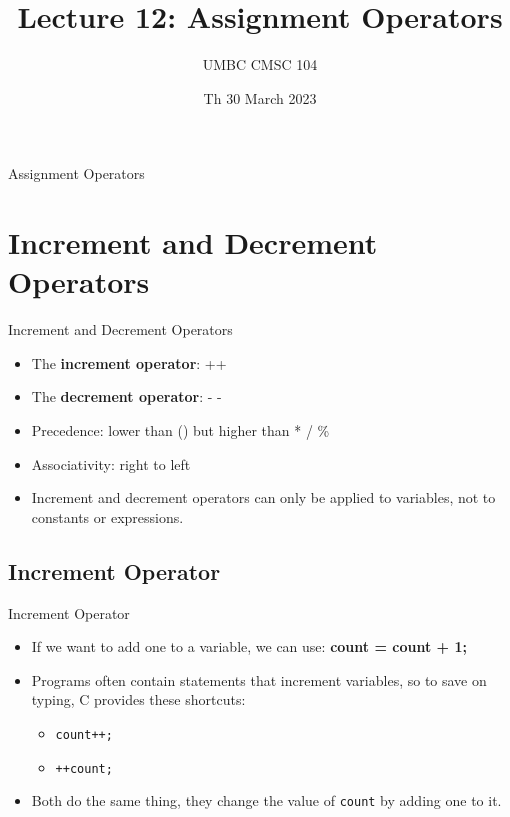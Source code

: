 \documentclass[graphics]{beamer}
\title{Lecture 12: Assignment Operators}
\author{UMBC CMSC 104}
\date{Th 30 March 2023}
\begin{document}
\begin{frame}{}
\centering
    Assignment Operators
\end{frame}

\frame{\tableofcontents}

\section{Increment and Decrement Operators}
\begin{frame}{Increment and Decrement Operators}
    \begin{itemize}
        \item The \textbf{increment operator}: ++
        \item The \textbf{decrement operator}: - -
        \item Precedence: lower than () but higher than * / \%
        \item Associativity: right to left
        \item Increment and decrement operators can only be applied to variables, not to constants or expressions.
    \end{itemize}
\end{frame}

\subsection{Increment Operator}
\begin{frame}{Increment Operator}
    \begin{itemize}
        \item If we want to add one to a variable, we can use: \textbf{count = count + 1;}
        \item Programs often contain statements that increment variables, so to save on typing, C provides these shortcuts:
        \begin{itemize}
            \item \texttt{count++;}
            \item \texttt{++count;}
        \end{itemize}
        \item Both do the same thing, they change the value of \texttt{count} by adding one to it.
    \end{itemize}
\end{frame}
\end{document}
